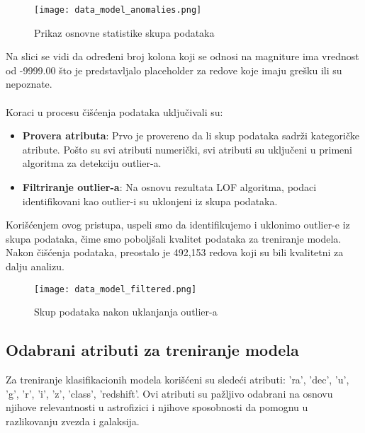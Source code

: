 \documentclass[a4paper,12pt]{article}
\begin{document}
\begin{figure}[h!]
\centering
\texttt{[image: data\_model\_anomalies.png]}
\caption{Prikaz osnovne statistike skupa podataka}
\label{fig:sql_query}
\end{figure}

Na slici se vidi da određeni broj kolona koji se odnosi na magniture ima vrednost od -9999.00 što je predstavljalo placeholder za redove koje imaju grešku ili su nepoznate.\\\\
Koraci u procesu čišćenja podataka uključivali su:
\begin{itemize}
    \item \textbf{Provera atributa}: Prvo je provereno da li skup podataka sadrži kategoričke atribute. Pošto su svi atributi numerički, svi atributi su uključeni u primeni algoritma za detekciju outlier-a.
    \item \textbf{Filtriranje outlier-a}: Na osnovu rezultata LOF algoritma, podaci identifikovani kao outlier-i su uklonjeni iz skupa podataka.
\end{itemize}
Korišćenjem ovog pristupa, uspeli smo da identifikujemo i uklonimo outlier-e iz skupa podataka, čime smo poboljšali kvalitet podataka za treniranje modela. Nakon čišćenja podataka, preostalo je 492,153 redova koji su bili kvalitetni za dalju analizu.

\begin{figure}[h!]
\centering
\texttt{[image: data\_model\_filtered.png]}
\caption{Skup podataka nakon uklanjanja outlier-a}
\label{fig:sql_query}
\end{figure}

\subsection{Odabrani atributi za treniranje modela}

Za treniranje klasifikacionih modela korišćeni su sledeći atributi: 'ra', 'dec', 'u', 'g', 'r', 'i', 'z', 'class', 'redshift'. Ovi atributi su pažljivo odabrani na osnovu njihove relevantnosti u astrofizici i njihove sposobnosti da pomognu u razlikovanju zvezda i galaksija.
\end{document}
